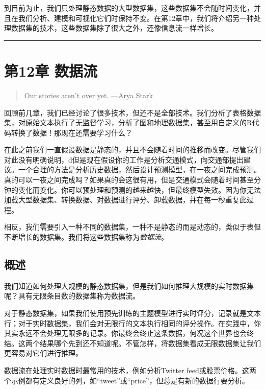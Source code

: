 \documentclass[
]{article}
\begin{document}
到目前为止，我们只处理静态数据的大型数据集，这些数据集不会随时间变化，并且在我们分析、建模和可视化它们时保持不变。在第12章中，我们将介绍另一种处理数据集的技术，这些数据集除了很大之外，还像信息流一样增长。

\begin{center}\rule{0.5\linewidth}{\linethickness}\end{center}

\hypertarget{ux7b2c12ux7ae0-ux6570ux636eux6d41}{%
\section{第12章 数据流}\label{ux7b2c12ux7ae0-ux6570ux636eux6d41}}

\begin{quote}
Our stories aren't over yet. ---Arya Stark
\end{quote}

回顾前几章，我们已经讨论了很多技术，但还不是全部技术。我们分析了表格数据集，对原始文本执行了无监督学习，分析了图和地理数据集，甚至用自定义的R代码转换了数据！那现在还需要学习什么？

在此之前我们一直假设数据是静态的，并且不会随着时间的推移而改变。尽管我们对此没有明确说明，d但是现在假设你的工作是分析交通模式，向交通部提出建议。一个合理的方法是分析历史数据，然后设计预测模型，在一夜之间完成预测。真的可以一夜之间完成吗？如果真的会这很有用，但是交通模式会随着时间甚至分钟的变化而变化。你可以预处理和预测的越来越快，但最终模型失效。因为你无法加载大型数据集、转换数据、对数据进行评分、卸载数据，并在每一秒重复此过程。

相反，我们需要引入一种不同的数据集，一种不是静态的而是动态的，类似于表但不断增长的数据集。我们将这些数据集称为\emph{数据流}。

\hypertarget{ux6982ux8ff0-11}{%
\subsection{概述}\label{ux6982ux8ff0-11}}

我们知道如何处理大规模的静态数据集，但是我们如何推理大规模的实时数据集呢？具有无限条目数的数据集称为数据流。

对于静态数据集，如果我们使用预先训练的主题模型进行实时评分，记录就是文本行；对于实时数据集，我们会对无限行的文本执行相同的评分操作。在实践中，你其实永远不会处理无限多的记录。你最终会终止这条数据，何况这个世界也会终结。这两个结果哪个先到还不知道呢。不管怎样，将数据集看成无限数据集让我们更容易对它们进行推理。

数据流在处理实时数据时最常用的技术，例如分析Twitter
feed或股票价格。这两个示例都有定义良好的列，如``tweet''或``price''，但总是有新的数据行要分析。
\end{document}
